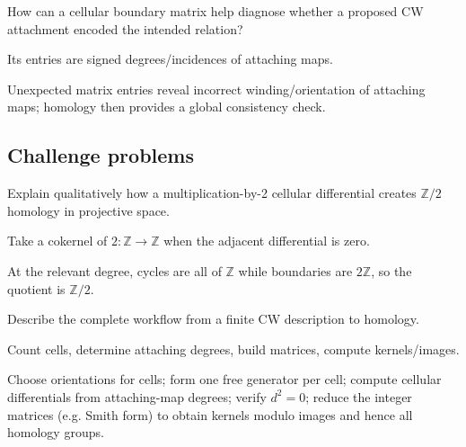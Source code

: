 \begin{exercise}\label{exr:viii18-ped-14}
How can a cellular boundary matrix help diagnose whether a proposed CW attachment encoded the intended relation?
\end{exercise}
\begin{hint}
Its entries are signed degrees/incidences of attaching maps.
\end{hint}
\begin{solution}
Unexpected matrix entries reveal incorrect winding/orientation of attaching maps; homology then provides a global consistency check.
\end{solution}

\subsection*{Challenge problems}

\begin{exercise}\label{exr:viii18-ped-15}
Explain qualitatively how a multiplication-by-2 cellular differential creates $\mathbb Z/2$ homology in projective space.
\end{exercise}
\begin{hint}
Take a cokernel of $2:\mathbb Z\to\mathbb Z$ when the adjacent differential is zero.
\end{hint}
\begin{solution}
At the relevant degree, cycles are all of $\mathbb Z$ while boundaries are $2\mathbb Z$, so the quotient is $\mathbb Z/2$.
\end{solution}

\begin{exercise}\label{exr:viii18-ped-16}
Describe the complete workflow from a finite CW description to homology.
\end{exercise}
\begin{hint}
Count cells, determine attaching degrees, build matrices, compute kernels/images.
\end{hint}
\begin{solution}
Choose orientations for cells; form one free generator per cell; compute cellular differentials from attaching-map degrees; verify $d^2=0$; reduce the integer matrices (e.g. Smith form) to obtain kernels modulo images and hence all homology groups.
\end{solution}

